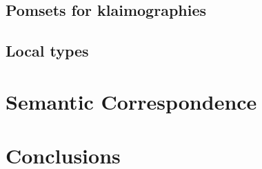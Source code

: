 \documentclass[runningheads,a4paper]{llncs}
\begin{document}
\subsection{Pomsets for klaimographies}
\label{sec:globsem}

\subsection{Local types}
\label{sec:locsem}


\section{Semantic Correspondence}
\label{sec:corr}


\section{Conclusions}
\label{sec:disc}\label{sec:conc}





\iffinal
\else
 \newpage
 \setcounter{tocdepth}{2}
 \listoffixmes
\fi
\end{document}
